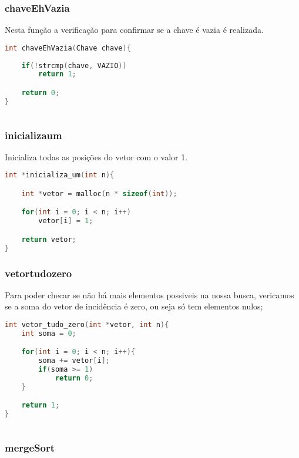 \documentclass{article}
\begin{document}
\subsubsection{chaveEhVazia}
Nesta função a verificação para confirmar se a chave é vazia é realizada.

\begin{lstlisting}[caption={Função chaveEhVazia},label={lst:cod7},language=C]
int chaveEhVazia(Chave chave){
    
    if(!strcmp(chave, VAZIO))
        return 1;

    return 0;
}
    
\end{lstlisting}

\subsubsection{inicializa\textunderscore um}

Inicializa todas as posições do vetor com o valor 1.

\begin{lstlisting}[caption={Função inicializa\textunderscore um},label={lst:cod7},language=C]
int *inicializa_um(int n){

    int *vetor = malloc(n * sizeof(int));

    for(int i = 0; i < n; i++)
        vetor[i] = 1;

    return vetor;
}
\end{lstlisting}

\subsubsection{vetor\textunderscore tudo\textunderscore zero}

Para poder checar se não há mais elementos possiveis na nossa busca,
vericamos se a soma do vetor de incidência é zero, ou seja só tem elementos nulos;


\begin{lstlisting}[caption={Função vetor\textunderscore tudo\textunderscore zero},label={lst:cod7},language=C]
int vetor_tudo_zero(int *vetor, int n){
    int soma = 0;

    for(int i = 0; i < n; i++){
        soma += vetor[i];
        if(soma >= 1)
            return 0; 
    }

    return 1;
}
    
\end{lstlisting}

\subsubsection{mergeSort}
\end{document}
